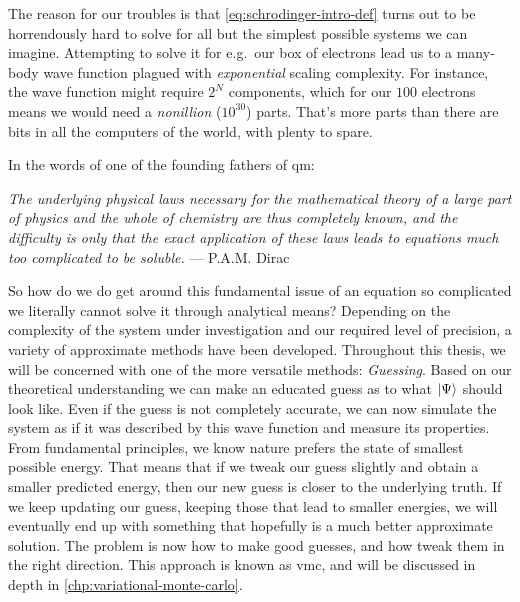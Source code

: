 \documentclass[Thesis.tex]{subfiles}
\begin{document}
The reason for our troubles is that \cref{eq:schrodinger-intro-def} turns out to
be horrendously hard to solve for all but the simplest possible systems we can
imagine. Attempting to solve it for e.g.\ our box of electrons lead us to
a many-body wave function plagued with \emph{exponential} scaling complexity.
For instance, the wave function might require $2^N$ components, which for our
$\num{100}$ electrons means we would need a \emph{nonillion} ($10^{30}$) parts. That's
more parts than there are bits in all the computers of the world, with plenty to
spare.

\begin{comment}
In most other areas of science we have been able to tame the mathematical
challenges through sophisticated high-performance computational frameworks.
Scaling complexities of $N^2$, $N^3$ or similar can usually be overcome by
simply using bigger and better computers, all the way to supercomputers with
hundreds of thousands of cores. But exponential scaling - that becomes
infeasible quickly.
\end{comment}

In the words of one of the founding fathers of \acrshort{qm}:
\begin{displayquote}
\emph{The underlying physical laws necessary for the mathematical theory of a large
part of physics and the whole of chemistry are thus completely known, and the
difficulty is only that the exact application of these laws leads to equations
much too complicated to be soluble.} --- P.A.M. Dirac
\end{displayquote}

So how do we do get around this fundamental issue of an equation so complicated
we literally cannot solve it through analytical means? Depending on the
complexity of the system under investigation and our required level of
precision, a variety of approximate methods have been developed. Throughout this
thesis, we will be concerned with one of the more versatile methods:
\emph{Guessing}. Based on our theoretical understanding we can make an educated
guess as to what $| \Psi \rangle$ should look like. Even if the guess is not
completely accurate, we can now simulate the system as if it was described by
this wave function and measure its properties. From fundamental principles, we
know nature prefers the state of smallest possible energy. That means that if we
tweak our guess slightly and obtain a smaller predicted energy, then our new
guess is closer to the underlying truth. If we keep updating our guess, keeping
those that lead to smaller energies, we will eventually end up with something
that hopefully is a much better approximate solution. The problem is now how to
make good guesses, and how tweak them in the right direction. This approach is
known as \acrfull{vmc}, and will be discussed in depth in
\cref{chp:variational-monte-carlo}.\\
\end{document}
